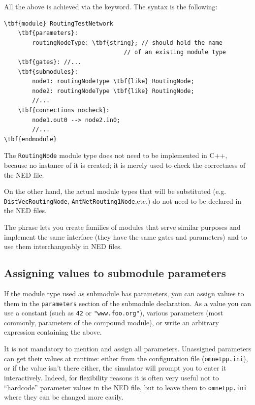 All the above is achieved via the  keyword.
The syntax is the following:

\begin{Verbatim}[commandchars=\\\{\}]
\tbf{module} RoutingTestNetwork
    \tbf{parameters}:
        routingNodeType: \tbf{string}; // should hold the name
                                  // of an existing module type
    \tbf{gates}: //...
    \tbf{submodules}:
        node1: routingNodeType \tbf{like} RoutingNode;
        node2: routingNodeType \tbf{like} RoutingNode;
        //...
    \tbf{connections nocheck}:
        node1.out0 --> node2.in0;
        //...
\tbf{endmodule}
\end{Verbatim}

The \texttt{RoutingNode} module type does not need to be implemented in
C++, because no instance of it is created; it is merely used
to check the correctness of the NED file.

On the other hand, the actual module types that will be substituted
(e.g. \texttt{DistVecRoutingNode}, \texttt{AntNetRouting1Node},etc.)
do not need to be declared in the NED files.

The  phrase lets you create families
of modules that serve similar purposes and implement the same interface
(they have the same gates and parameters)
and to use them interchangeably in NED files.




\subsection{Assigning values to submodule parameters}


If the module type used as submodule has parameters, you can assign
values to them in the \texttt{parameters} section of the submodule
declaration.
As a value you can use a constant (such as \texttt{42} or
\texttt{"www.foo.org"}), various parameters (most commonly, parameters
of the compound module), or write an arbitrary expression containing
the above.

It is not mandatory to mention and assign all parameters.
Unassigned parameters can get their values at runtime: either from
the configuration file (\texttt{omnetpp.ini}), or if the value
isn't there either, the simulator will prompt you to enter it
interactively. Indeed, for flexibility reasons it is often very useful
not to ``hardcode'' parameter values in the NED file,
but to leave them to \texttt{omnetpp.ini} where they can be
changed more easily.


